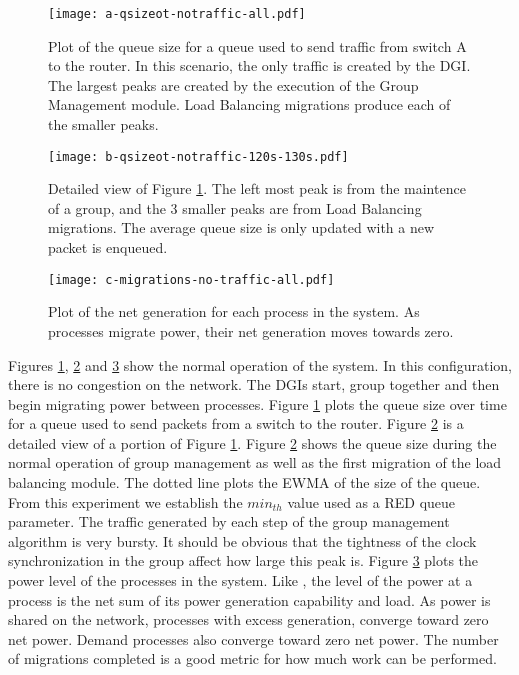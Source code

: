 \begin{figure}
\texttt{[image: a-qsizeot-notraffic-all.pdf]}
\caption{Plot of the queue size for a queue used to send traffic from switch A to the router. In this scenario, the only traffic is created by the \ac{DGI}. The largest peaks are created by the execution of the Group Management module. Load Balancing migrations produce each of the smaller peaks.}
\label{fig:plota}
\end{figure}

\begin{figure}
\texttt{[image: b-qsizeot-notraffic-120s-130s.pdf]}
\caption{Detailed view of Figure \ref{fig:plota}. The left most peak is from the maintence of a group, and the 3 smaller peaks are from Load Balancing migrations. The average queue size is only updated with a new packet is enqueued.}
\label{fig:plotb}
\end{figure}

\begin{figure}
\texttt{[image: c-migrations-no-traffic-all.pdf]}
\caption{Plot of the net generation for each process in the system. As processes migrate power, their net generation moves towards zero.}
\label{fig:plotc}
\end{figure}

Figures \ref{fig:plota}, \ref{fig:plotb} and \ref{fig:plotc} show the normal operation of the system.
In this configuration, there is no congestion on the network. 
The \ac{DGI}s start, group together and then begin migrating power between processes.
Figure \ref{fig:plota} plots the queue size over time for a queue used to send packets from a switch to the router.
Figure \ref{fig:plotb} is a detailed view of a portion of Figure \ref{fig:plota}.
Figure \ref{fig:plotb} shows the queue size during the normal operation of group management as well as the first migration of the load balancing module.
The dotted line plots the \ac{EWMA} of the size of the queue.
From this experiment we establish the $min_{th}$ value used as a \ac{RED} queue parameter.
The traffic generated by each step of the group management algorithm is very bursty.
It should be obvious that the tightness of the clock synchronization in the group affect how large this peak is.
Figure \ref{fig:plotc} plots the power level of the processes in the system.
Like \cite{HILTESTBED}, the level of the power at a process is the net sum of its power generation capability and load.
As power is shared on the network, processes with excess generation, converge toward zero net power.
Demand processes also converge toward zero net power.
The number of migrations completed is a good metric for how much work can be performed.

